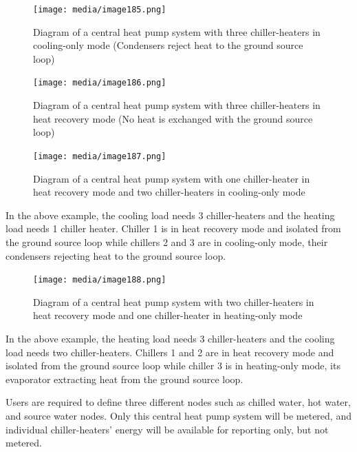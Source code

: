 \begin{figure}[hbtp] %
    \centering
    \texttt{[image: media/image185.png]}
    \caption{Diagram of a central heat pump system with three chiller-heaters in cooling-only mode (Condensers reject heat to the ground source loop) \protect \label{fig:diagram-of-a-central-heat-pump-system-with}}
\end{figure}

\begin{figure}[hbtp] %
    \centering
    \texttt{[image: media/image186.png]}
    \caption{Diagram of a central heat pump system with three chiller-heaters in heat recovery mode         (No heat is exchanged with the ground source loop) \protect \label{fig:diagram-of-a-central-heat-pump-system-with-001}}
\end{figure}

\begin{figure}[hbtp] %
    \centering
    \texttt{[image: media/image187.png]}
    \caption{Diagram of a central heat pump system with one chiller-heater in heat recovery mode and two chiller-heaters in cooling-only mode \protect \label{fig:diagram-of-a-central-heat-pump-system-with-002}}
\end{figure}

In the above example, the cooling load needs 3 chiller-heaters and the heating load needs 1 chiller heater. Chiller 1 is in heat recovery mode and isolated from the ground source loop while chillers 2 and 3 are in cooling-only mode, their condensers rejecting heat to the ground source loop.

\begin{figure}[hbtp] %
    \centering
    \texttt{[image: media/image188.png]}
    \caption{Diagram of a central heat pump system with two chiller-heaters in heat recovery mode and one chiller-heater in heating-only mode \protect \label{fig:diagram-of-a-central-heat-pump-system-with-003}}
\end{figure}

In the above example, the heating load needs 3 chiller-heaters and the cooling load needs two chiller-heaters. Chillers 1 and 2 are in heat recovery mode and isolated from the ground source loop while chiller 3 is in heating-only mode, its evaporator extracting heat from the ground source loop.

Users are required to define three different nodes such as chilled water, hot water, and source water nodes. Only this central heat pump system will be metered, and individual chiller-heaters' energy will be available for reporting only, but not metered.

